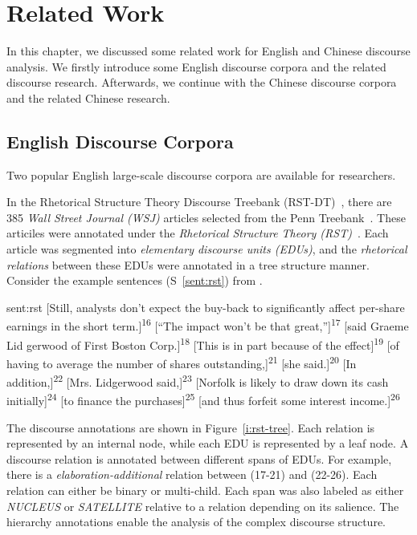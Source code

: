 %
%
%
\chapter{Related Work}
\label{c:related}

In this chapter, we discussed some related work for English and Chinese discourse
analysis. We firstly introduce some English discourse corpora and the
related discourse research. Afterwards, we continue with the Chinese
discourse corpora and the related Chinese research.

\section{English Discourse Corpora}

Two popular English large-scale discourse corpora are available for researchers.

In the Rhetorical Structure Theory Discourse Treebank (RST-DT)~\citep{Carlson01building},
there are 385 \textit{Wall Street Journal (WSJ)} articles selected from
the Penn Treebank~\citep{marcus1993building}. These articiles were annotated under
the \textit{Rhetorical Structure Theory (RST)}~\citep{mann-thompson88}.
Each article was segmented into \textit{elementary discourse units (EDUs)}, and the
\textit{rhetorical relations} between these EDUs were annotated in a tree structure
manner.
Consider the example sentences (S~\ref{sent:rst})  from \cite{Carlson01building}.

\begin{sent}{sent:rst}{}
[Still, analysts don't expect the buy-back to significantly affect per-share earnings in the short
term.]\textsuperscript{16} [``The impact won't be that great,'']\textsuperscript{17}
[said Graeme Lid gerwood of First Boston Corp.]\textsuperscript{18}
[This is in part because of the effect]\textsuperscript{19}
[of having to average the number of shares outstanding,]\textsuperscript{21}
[she said.]\textsuperscript{20} [In addition,]\textsuperscript{22}
[Mrs. Lidgerwood said,]\textsuperscript{23}
[Norfolk is likely to draw down its cash initially]\textsuperscript{24}
[to finance the purchases]\textsuperscript{25}
[and thus forfeit some interest income.]\textsuperscript{26}
\end{sent}

The discourse annotations are shown in Figure~\ref{i:rst-tree}. Each relation is represented
by an internal node, while each EDU is represented by a leaf node. A discourse relation is
annotated between different spans of EDUs. For example, there is a \textit{elaboration-additional}
relation between (17-21) and (22-26). Each relation can either be binary or multi-child.
Each span was also labeled as either \textit{NUCLEUS} or \textit{SATELLITE} relative
to a relation depending on its salience. The hierarchy annotations enable the analysis of
the complex discourse structure.

